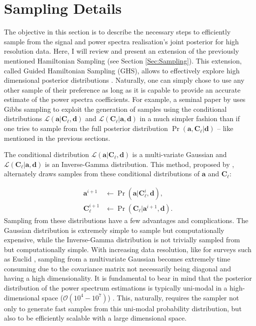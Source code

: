 \section{Sampling Details}\label{Sec:BPL:Sampling}
The objective in this section is to describe the necessary steps to efficiently sample from the signal and power spectra realisation's joint posterior for high resolution data. Here, I will review and present an extension of the previously mentioned Hamiltonian Sampling (see Section \ref{Sec:Sampling}). This extension, called Guided Hamiltonian Sampling (GHS), allows to effectively explore high dimensional posterior distributions \citep{SreeThesis,2013-GuidedHamiltonian}. Naturally, one can simply chose to use any other sample of their preference as long as it is capable to provide an accurate estimate of the power spectra coefficients. For example, a seminal paper by \cite{Wandelt2004} uses Gibbs sampling \citep{Geman1984,Casella1992} to exploit the generation of samples using the conditional distributions $\mathcal{L}(\mathbf{a}|\textbf{C}_{\ell},\mathbf{d})$ and $\mathcal{L}(\textbf{C}_{\ell}|\mathbf{a},\mathbf{d})$ in a much simpler fashion than if one tries to sample from the full posterior distribution $\Pr(\mathbf{a},\textbf{C}_{\ell}|\mathbf{d})$ -- like mentioned in the previous sections.

\qquad The conditional distribution $\mathcal{L}(\mathbf{a}|\textbf{C}_{\ell},\mathbf{d})$ is a multi-variate Gaussian and $\mathcal{L}(\textbf{C}_{\ell}|\mathbf{a},\mathbf{d})$ is an Inverse-Gamma distribution. This method, proposed by \cite{Wandelt2004}, alternately draws samples from these conditional distributions of $\mathbf{a}$ and $\textbf{C}_{\ell}$:

\begin{align}
\mathbf{a}^{i+1} &\longleftarrow\Pr(\mathbf{a}|\textbf{C}_{\ell}^i,\mathbf{d}), \nonumber \\
\textbf{C}_{\ell}^{i+1} & \longleftarrow\Pr(\textbf{C}_{\ell}|\mathbf{a}^{i+1},\mathbf{d}).\nonumber
\end{align}
Sampling from these distributions have a few advantages and complications. The Gaussian distribution is extremely simple to sample but computationally expensive, while the Inverse-Gamma distribution is not trivially sampled from but computationally simple. With increasing data resolution, like for surveys such as Euclid \citep{2011EuclidRedPaper}, sampling from a multivariate Gaussian becomes extremely time consuming due to the covariance matrix not necessarily being diagonal and having a high dimensionality. It is fundamental to bear in mind that the posterior distribution of the power spectrum estimations is typically uni-modal in a high-dimensional space ($\mathcal{O}(10^{4}-10^{7})$) \citep{Taylor2008,Wandelt2004}. This, naturally, requires the sampler not only to generate fast samples from this uni-modal probability distribution, but also to be efficiently scalable with a large dimensional space. 

